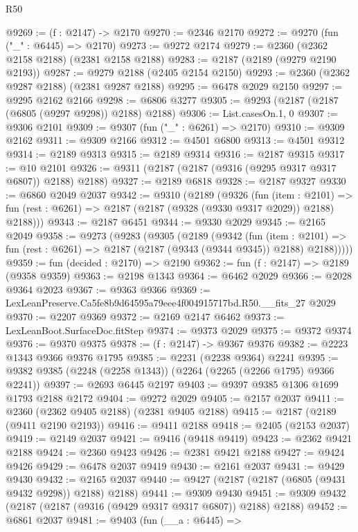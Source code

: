 \begin{lexlean}{R50}
\begin{coremodule}
@9269 := (f : @2147) -> @2170
@9270 := @2346 @2170
@9272 := @9270 (fun ("_" : @6445) => @2170)
@9273 := @9272 @2174
@9279 := @2360 (@2362 @2158 @2188) (@2381 @2158 @2188)
@9283 := @2187 (@2189 (@9279 @2190 @2193))
@9287 := @9279 @2188 (@2405 @2154 @2150)
@9293 := @2360 (@2362 @9287 @2188) (@2381 @9287 @2188)
@9295 := @6478 @2029 @2150
@9297 := @9295 @2162 @2166
@9298 := @6806 @3277
@9305 := @9293 (@2187 (@2187 (@6805 (@9297 @9298)) @2188) @2188)
@9306 := List.casesOn.{1, 0}
@9307 := @9306 @2101
@9309 := @9307 (fun ("_" : @6261) => @2170)
@9310 := @9309 @2162
@9311 := @9309 @2166
@9312 := @4501 @6800
@9313 := @4501 @9312
@9314 := @2189 @9313
@9315 := @2189 @9314
@9316 := @2187 @9315
@9317 := @10 @2101
@9326 := @9311 (@2187 (@2187 (@9316 (@9295 @9317 @9317 @6807)) @2188) @2188)
@9327 := @2189 @6818
@9328 := @2187 @9327
@9330 := @6860 @2049 @2037
@9342 := @9310
    (@2189
      (@9326
        (fun (item : @2101) =>
        fun (rest : @6261) => @2187 (@2187 (@9328 (@9330 @9317 @2029)) @2188) @2188)))
@9343 := @2187 @6451
@9344 := @9330 @2029
@9345 := @2165 @2049
@9358 := @9273
    (@9283
      (@9305
        (@2189
          (@9342
            (fun (item : @2101) =>
            fun (rest : @6261) => @2187 (@2187 (@9343 (@9344 @9345)) @2188) @2188)))))
@9359 := fun (decided : @2170) => @2190
@9362 := fun (f : @2147) => @2189 (@9358 @9359)
@9363 := @2198 @1343
@9364 := @6462 @2029
@9366 := @2028 @9364 @2023
@9367 := @9363 @9366
@9369 := LexLeanPreserve.Ca5fe8b9d64595a79eee4f004915717bd.R50.__fits_27 @2029
@9370 := @2207 @9369
@9372 := @2169 @2147 @6462
@9373 := LexLeanBoot.SurfaceDoc.fitStep
@9374 := @9373 @2029
@9375 := @9372 @9374
@9376 := @9370 @9375
@9378 := (f : @2147) -> @9367 @9376
@9382 := @2223 @1343 @9366 @9376 @1795
@9385 := @2231 (@2238 @9364) @2241
@9395 := @9382 @9385 (@2248 (@2258 @1343)) (@2264 (@2265 (@2266 @1795) @9366 @2241))
@9397 := @2693 @6445 @2197
@9403 := @9397 @9385 @1306 @1699 @1793 @2188 @2172
@9404 := @9272 @2029
@9405 := @2157 @2037
@9411 := @2360 (@2362 @9405 @2188) (@2381 @9405 @2188)
@9415 := @2187 (@2189 (@9411 @2190 @2193))
@9416 := @9411 @2188
@9418 := @2405 (@2153 @2037)
@9419 := @2149 @2037
@9421 := @9416 (@9418 @9419)
@9423 := @2362 @9421 @2188
@9424 := @2360 @9423
@9426 := @2381 @9421 @2188
@9427 := @9424 @9426
@9429 := @6478 @2037 @9419
@9430 := @2161 @2037
@9431 := @9429 @9430
@9432 := @2165 @2037
@9440 := @9427 (@2187 (@2187 (@6805 (@9431 @9432 @9298)) @2188) @2188)
@9441 := @9309 @9430
@9451 := @9309 @9432 (@2187 (@2187 (@9316 (@9429 @9317 @9317 @6807)) @2188) @2188)
@9452 := @6861 @2037
@9481 := @9403
    (fun (__a : @6445) =>

\end{coremodule}
\end{lexlean}
